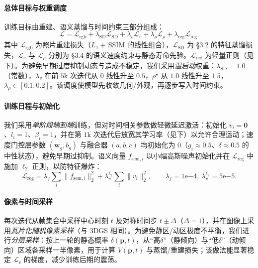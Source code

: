 \documentclass[10pt,conference]{IEEEtran} %
\begin{document}
\paragraph{总体目标与权重调度}
训练目标由重建、语义蒸馏与时间约束三部分组成：
\begin{equation}
\mathcal L=\mathcal L_{\mathrm{rgb}}+\lambda_{\mathrm{SD}}\mathcal L_{\mathrm{SD}}
+\lambda_v \mathcal L_v+\lambda_\rho \mathcal L_\rho+\lambda_{\mathrm{reg}}\mathcal L_{\mathrm{reg}}.
\label{eq:opt_total}
\end{equation}
其中 $\mathcal L_{\mathrm{rgb}}$ 为照片重建损失（$L_1{+}\,$SSIM 的线性组合），$\mathcal L_{\mathrm{SD}}$ 为 §3.2 的特征蒸馏损失，$\mathcal L_v$ 与 $\mathcal L_\rho$ 分别为 §3.4 的语义速度约束与静态寿命先验。$\mathcal L_{\mathrm{reg}}$ 为轻量正则（见下）。为避免早期过度抑制动态与造成不稳定，我们采用\emph{温启动}权重：$\lambda_{\mathrm{SD}}{=}1.0$（常数），$\lambda_v$ 在前 $5$k 次迭代从 $0$ 线性升至 $0.5$，$\rho^\star$ 从 $1.0$ 线性升至 $1.5$，$\lambda_\rho\in[0.1,0.2]$。该调度使模型先收敛几何/外观，再逐步写入时间约束。

\paragraph{训练日程与初始化}
我们采用\emph{单阶段端到端}训练，但对时间相关参数做轻微延迟激活：初始化 $v_i{=}\mathbf 0$、$l_i{=}1$、$\beta_i{=}1$，并在第 $1$k 次迭代后放宽其学习率（见下）以允许合理运动；速度门控层参数 $(\mathbf w_g,b_g)$ 与融合器 $(a,b,c)$ 均初始化为 $0$（$g_i\!\approx\!0.5$、$\delta\!\approx\!0.5$ 的中性状态），避免早期过抑制。语义向量 $f_{\mathrm{sem},i}$ 以小幅高斯噪声初始化并在 $\mathcal L_{\mathrm{reg}}$ 中施加 $\ell_2$ 正则，以防特征爆炸：
\begin{equation}
\mathcal L_{\mathrm{reg}}=\lambda_f\sum_i \|f_{\mathrm{sem},i}\|_2^2+\lambda_v^{\ell_2}\sum_i \|v_i\|_2^2,
\qquad \lambda_f{=}1\mathrm{e}{-4},\ \lambda_v^{\ell_2}{=}5\mathrm{e}{-5}.
\label{eq:opt_reg}
\end{equation}

\paragraph{像素与时间采样}
每次迭代从帧集合中采样中心时刻 $t$ 及对称时间步 $t\pm\Delta$（$\Delta{=}1$），并在图像上采用\emph{瓦片化随机像素采样}（与 3DGS 相同）。为避免静区/动区极度不平衡，我们进行\emph{分层采样}：按上一轮的静态概率 $\delta(\mathbf p,t)$，从“高$\delta$”（静倾向）与“低$\delta$”（动倾向）区域各采样一半像素，用于计算 $V(\mathbf p,t)$ 与蒸馏/重建损失；该做法能显著稳定 $\mathcal L_v$ 的梯度，减少训练后期的震荡。
\end{document}
